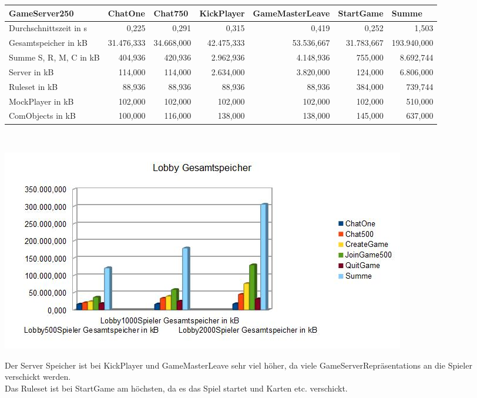 \documentclass[a4paper]{article}
\begin{document}
\noindent
\begin{tabular}{|l|r|r|r|r|r|r|}
\hline
GameServer250 & \multicolumn{1}{l|}{ChatOne} & \multicolumn{1}{l|}{Chat750} & \multicolumn{1}{l|}{KickPlayer} & \multicolumn{1}{l|}{GameMasterLeave} & \multicolumn{1}{l|}{StartGame} & \multicolumn{1}{l|}{Summe} \\ \hline
Durchschnittszeit in s & 0,225 & 0,291 & 0,315 & 0,419 & 0,252 & 1,503 \\ \hline
Gesamtspeicher in kB & 31.476,333 & 34.668,000 & 42.475,333 & 53.536,667 & 31.783,667 & 193.940,000 \\ \hline
Summe S, R, M, C in kB & 404,936 & 420,936 & 2.962,936 & 4.148,936 & 755,000 & 8.692,744 \\ \hline
Server in kB & 114,000 & 114,000 & 2.634,000 & 3.820,000 & 124,000 & 6.806,000 \\ \hline
Ruleset in kB & 88,936 & 88,936 & 88,936 & 88,936 & 384,000 & 739,744 \\ \hline
MockPlayer in kB & 102,000 & 102,000 & 102,000 & 102,000 & 102,000 & 510,000 \\ \hline
ComObjects in kB & 100,000 & 116,000 & 138,000 & 138,000 & 145,000 & 637,000 \\ \hline
\end{tabular}
\ \\
\begin{center}
\includegraphics[scale=0.75]{5}
\end{center}
Der Server Speicher ist bei KickPlayer und GameMasterLeave sehr viel höher, da viele GameServerRepräsentations an die Spieler verschickt werden. \\
Das Ruleset ist bei StartGame am höchsten, da es das Spiel startet und Karten etc. verschickt.
\ \\
\ \\
\end{document}
